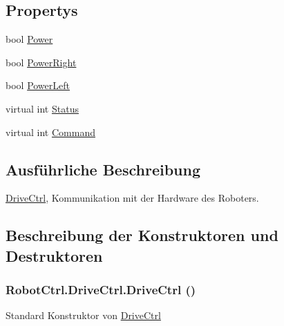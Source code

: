 \subsection*{Propertys}
\begin{DoxyCompactItemize}
\item 
bool \hyperlink{class_robot_ctrl_1_1_drive_ctrl_aef1505229ec4f37b5cc69377360c3f2a}{Power}
\item 
bool \hyperlink{class_robot_ctrl_1_1_drive_ctrl_a7fa4a69b83012c16657c9f88a0637754}{PowerRight}
\item 
bool \hyperlink{class_robot_ctrl_1_1_drive_ctrl_af59bc9fd9c92f7bae49654588693673a}{PowerLeft}
\item 
virtual int \hyperlink{class_robot_ctrl_1_1_drive_ctrl_a462a4b74b24efb494df863d1ac249b45}{Status}
\item 
virtual int \hyperlink{class_robot_ctrl_1_1_drive_ctrl_a45359565bdcb6293ed723acb48cae18b}{Command}
\end{DoxyCompactItemize}


\subsection{Ausführliche Beschreibung}
\hyperlink{class_robot_ctrl_1_1_drive_ctrl}{DriveCtrl}, Kommunikation mit der Hardware des Roboters. 

\subsection{Beschreibung der Konstruktoren und Destruktoren}
\hypertarget{class_robot_ctrl_1_1_drive_ctrl_a8f8e2ebe491712cb323748f7ecc4859a}{
\subsubsection[{DriveCtrl}]{\setlength{\rightskip}{0pt plus 5cm}RobotCtrl.DriveCtrl.DriveCtrl ()}}
\label{class_robot_ctrl_1_1_drive_ctrl_a8f8e2ebe491712cb323748f7ecc4859a}
Standard Konstruktor von \hyperlink{class_robot_ctrl_1_1_drive_ctrl}{DriveCtrl} 

